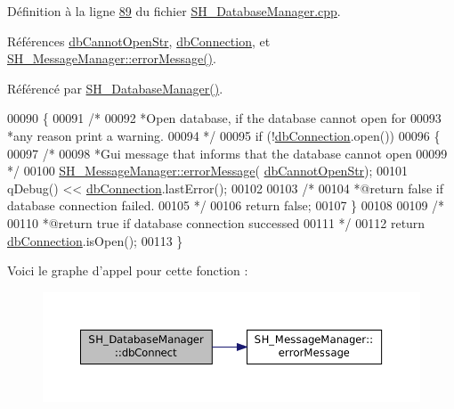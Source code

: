 Définition à la ligne \hyperlink{SH__DatabaseManager_8cpp_source_l00089}{89} du fichier \hyperlink{SH__DatabaseManager_8cpp_source}{S\-H\-\_\-\-Database\-Manager.\-cpp}.



Références \hyperlink{SH__DatabaseManager_8h_a19d48066a97c8a9a81827ccf23fd736f}{db\-Cannot\-Open\-Str}, \hyperlink{classSH__DatabaseManager_a9291f61c3abbba2c4f1567b1d8325f0e}{db\-Connection}, et \hyperlink{classSH__MessageManager_acb5615cc90f198f4768da800a5d32362}{S\-H\-\_\-\-Message\-Manager\-::error\-Message()}.



Référencé par \hyperlink{classSH__DatabaseManager_a7b5d0e372c153eb59cdab98588994904}{S\-H\-\_\-\-Database\-Manager()}.


\begin{DoxyCode}
00090 \{
00091     \textcolor{comment}{/*}
00092 \textcolor{comment}{            *Open database, if the database cannot open for
}
00093 \textcolor{comment}{            *any reason print a warning.
}
00094 \textcolor{comment}{            */}
00095     \textcolor{keywordflow}{if} (!\hyperlink{classSH__DatabaseManager_a9291f61c3abbba2c4f1567b1d8325f0e}{dbConnection}.open())
00096     \{
00097         \textcolor{comment}{/*}
00098 \textcolor{comment}{                 *Gui message that informs that the database cannot open
}
00099 \textcolor{comment}{                 */}
00100         \hyperlink{classSH__MessageManager_acb5615cc90f198f4768da800a5d32362}{SH\_MessageManager::errorMessage}(
      \hyperlink{SH__DatabaseManager_8h_a19d48066a97c8a9a81827ccf23fd736f}{dbCannotOpenStr});
00101         qDebug() << \hyperlink{classSH__DatabaseManager_a9291f61c3abbba2c4f1567b1d8325f0e}{dbConnection}.lastError();
00102 
00103         \textcolor{comment}{/*}
00104 \textcolor{comment}{                 *@return false if database connection failed.
}
00105 \textcolor{comment}{                 */}
00106         \textcolor{keywordflow}{return} \textcolor{keyword}{false};
00107     \}
00108 
00109     \textcolor{comment}{/*}
00110 \textcolor{comment}{             *@return true if database connection successed
}
00111 \textcolor{comment}{             */}
00112     \textcolor{keywordflow}{return} \hyperlink{classSH__DatabaseManager_a9291f61c3abbba2c4f1567b1d8325f0e}{dbConnection}.isOpen();
00113 \}
\end{DoxyCode}


Voici le graphe d'appel pour cette fonction \-:
\nopagebreak
\begin{figure}[H]
\begin{center}
\leavevmode
\includegraphics[width=350pt]{classSH__DatabaseManager_aeb077fe5437f435c0cbe8d77d96dd846_cgraph}
\end{center}
\end{figure}




